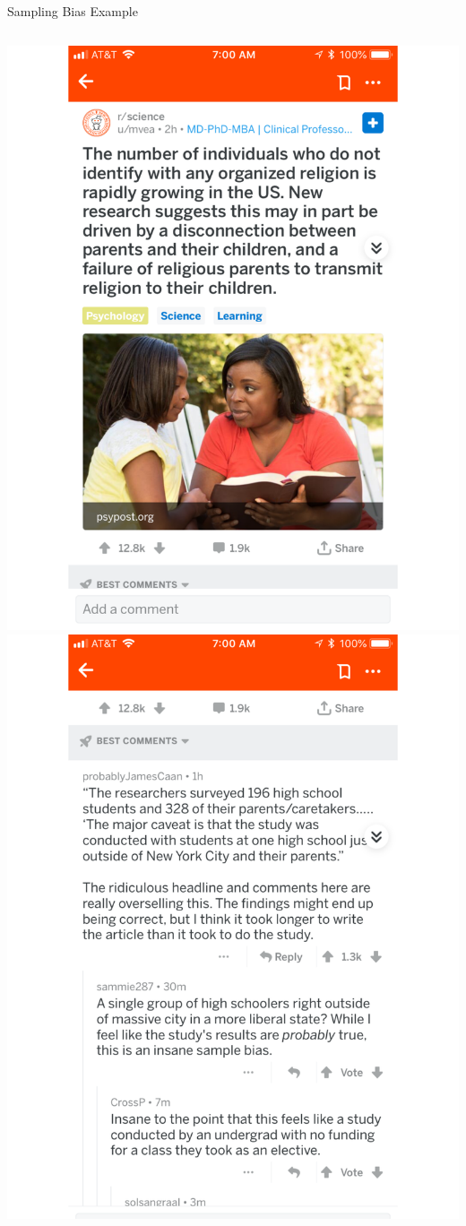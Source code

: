 \documentclass{beamer}
\begin{document}
\begin{frame}{Sampling Bias Example}
	\begin{columns}
		\includegraphics[width=\textwidth]{pic1}
		\includegraphics[width=\textwidth]{pic2}

\end{columns}
\end{frame}
\end{document}

